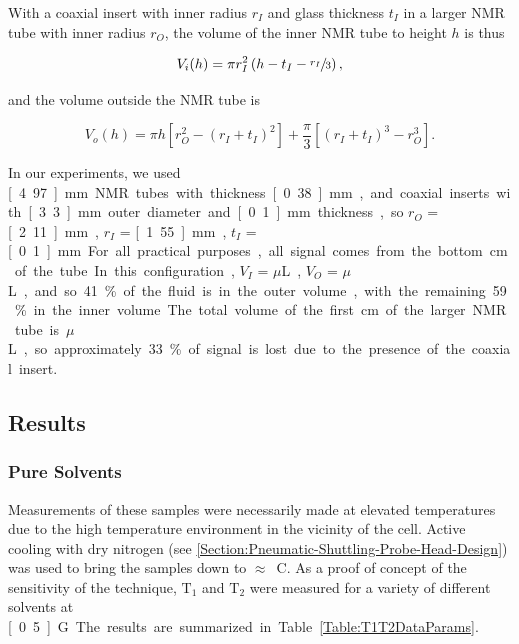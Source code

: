 \documentclass[PaulGanssle-Thesis.tex]{subfiles}
\begin{document}
With a coaxial insert with inner radius $r_{I}$ and glass thickness $t_{I}$ in a larger NMR tube with inner radius $r_{O}$, the volume of the inner NMR tube to height $h$ is thus

\begin{equation}
V_{i}(h) = \pi{}r_{I}^2\left(h-t_{I}-\sfrac{r_{I}}{3}\right),
\label{eqn:VolumeInnerTube}
\end{equation}

and the volume outside the NMR tube is

\begin{equation}
V_{o}(h) = \pi{}h\left[r_{O}^2-\left(r_{I}+t_{I}\right)^2\right] + \frac{\pi}{3}\left[\left(r_{I}+t_{I}\right)^3 - r_{O}^3\right].
\label{eqn:VolumeOuterTube}
\end{equation}

In our experiments, we used \unit[4.97]{mm} NMR tubes with thickness \unit[0.38]{mm}, and coaxial inserts with \unit[3.3]{mm} outer diameter and \unit[0.1]{mm} thickness, so $r_{O}$ = \unit[2.11]{mm}, $r_{I}$ = \unit[1.55]{mm}, $t_{I}$ = \unit[0.1]{mm}. For all practical purposes, all signal comes from the bottom \unit[2]{cm} of the tube. In this configuration, $V_{I}$ = \unit[146]{$\mu$L}, $V_{O}$ = \unit[102]{$\mu$L}, and so 41\% of the fluid is in the outer volume, with the remaining 59\% in the inner volume. The total volume of the first \unit[2]{cm} of the larger NMR tube is \unit[372]{$\mu$L}, so approximately 33\% of signal is lost due to the presence of the coaxial insert.

\subsection{Results}
\label{Section:Relaxation-Diffusion-Hydrocarbons-Results}
\subsubsection{Pure Solvents}
Measurements of these samples were necessarily made at elevated temperatures due to the high temperature environment in the vicinity of the cell. Active cooling with dry nitrogen (see \ref{Section:Pneumatic-Shuttling-Probe-Head-Design}) was used to bring the samples down to $\approx$\unit[37]{\degsym C}. As a proof of concept of the sensitivity of the technique, $\mathrm{T}_{1}$ and $\mathrm{T}_{2}$ were measured for a variety of different solvents at \unit[0.5]{G}. The results are summarized in Table \ref{Table:T1T2DataParams}.
\end{document}
